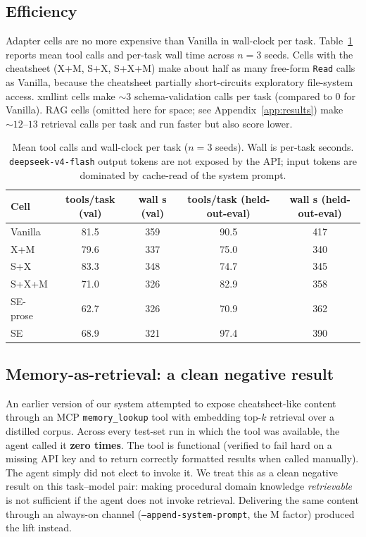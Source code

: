 \documentclass{article}
\begin{document}
\subsection{Efficiency}
\label{subsec:efficiency}

Adapter cells are no more expensive than Vanilla in wall-clock per task. Table~\ref{tab:efficiency} reports mean tool calls and per-task wall time across $n=3$ seeds. Cells with the cheatsheet (X+M, S+X, S+X+M) make about half as many free-form \texttt{Read} calls as Vanilla, because the cheatsheet partially short-circuits exploratory file-system access. xmllint cells make ${\sim}3$ schema-validation calls per task (compared to 0 for Vanilla). RAG cells (omitted here for space; see Appendix~\ref{app:results}) make ${\sim}12$--$13$ retrieval calls per task and run faster but also score lower.

\begin{table}[h]
  \caption{Mean tool calls and wall-clock per task ($n=3$ seeds). Wall is per-task seconds. \texttt{deepseek-v4-flash} output tokens are not exposed by the API; input tokens are dominated by cache-read of the system prompt.}
  \label{tab:efficiency}
  \centering
  \small
  \begin{tabular}{lcccc}
    \toprule
    \textbf{Cell} & \textbf{tools/task (val)} & \textbf{wall s (val)} & \textbf{tools/task (held-out-eval)} & \textbf{wall s (held-out-eval)} \\
    \midrule
    Vanilla  & 81.5 & 359 & 90.5 & 417 \\
    X+M  & 79.6 & 337 & 75.0 & 340 \\
    S+X  & 83.3 & 348 & 74.7 & 345 \\
    S+X+M  & 71.0 & 326 & 82.9 & 358 \\
    SE-prose & 62.7 & 326 & 70.9 & 362 \\
    SE  & 68.9 & 321 & 97.4 & 390 \\
    \bottomrule
  \end{tabular}
\end{table}

\subsection{Memory-as-retrieval: a clean negative result}
\label{subsec:memory-negative}

An earlier version of our system attempted to expose cheatsheet-like content through an MCP \texttt{memory\_lookup} tool with embedding top-$k$ retrieval over a distilled corpus. Across every test-set run in which the tool was available, the agent called it \textbf{zero times}. The tool is functional (verified to fail hard on a missing API key and to return correctly formatted results when called manually). The agent simply did not elect to invoke it. We treat this as a clean negative result on this task--model pair: making procedural domain knowledge \emph{retrievable} is not sufficient if the agent does not invoke retrieval. Delivering the same content through an always-on channel (\texttt{--append-system-prompt}, the M factor) produced the lift instead.
\end{document}
